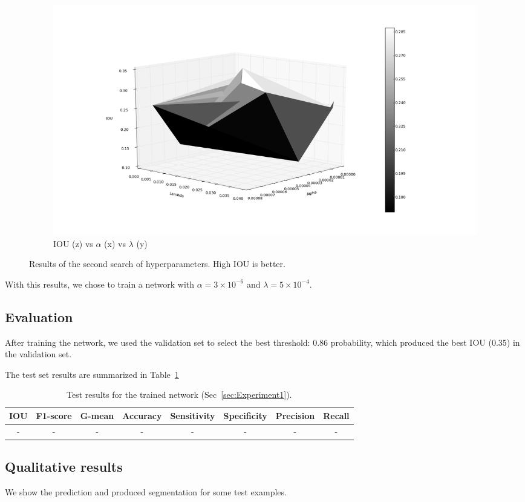 \begin{figure}[h]
	\begin{subfigure}{0.32\textwidth}
		\centering
                \includegraphics[width=\textwidth]{plots/hs2_trisurface.png}
         \caption{IOU (z) vs $\alpha$ (x) vs $\lambda$ (y)}
	\end{subfigure}
	\caption[Second hyperparameter search for Experiment 1]{Results of the second search of hyperparameters. High IOU is better.}
	 \label{fig:Hs2}
\end{figure}

With this results, we chose to train a network with $\alpha = 3 \times 10^{-6}$ and $\lambda = 5 \times 10^{-4}$.

\subsection{Evaluation}
After training the network, we used the validation set to select the best threshold: 0.86 probability, which produced the best IOU (0.35) in the validation set.

The test set results are summarized in Table~\ref{tab:Results1}
\begin{table}[h]
	\centering
	\begin{tabular}{cccccccc}
	\hline
	\textbf{IOU}	& \textbf{F1-score}	& \textbf{G-mean} &\textbf{Accuracy}	& \textbf{Sensitivity} & \textbf{Specificity} & \textbf{Precision} & \textbf{Recall}\\
	\hline
	- & - & - & - & - & - & - & -\\
	\hline
	\end{tabular}
	\caption[Results for Experiment 1]{Test results for the trained network (Sec~\ref{sec:Experiment1}).}
	\label{tab:Results1}
\end{table}

\subsection{Qualitative results}
We show the prediction and produced segmentation for some test examples.%

